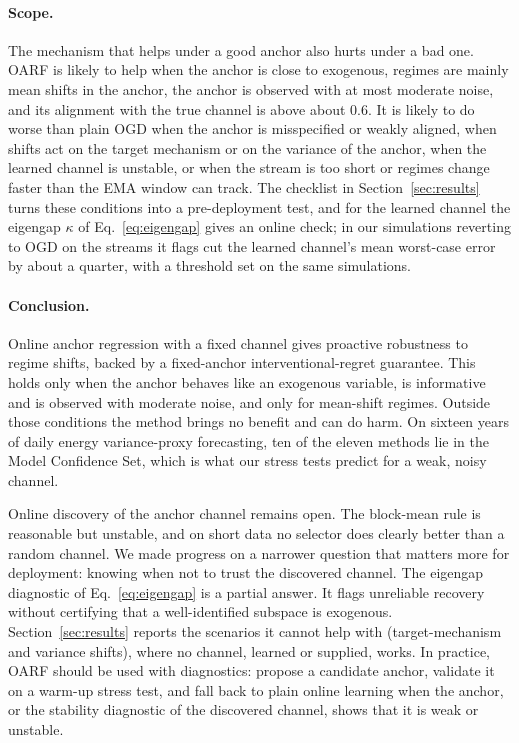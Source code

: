 \documentclass[11pt]{article}
\theoremstyle{plain}
\theoremstyle{remark}
\newcommand{\OARF}{\textsc{OARF}}
\begin{document}
\paragraph{Scope.}
The mechanism that helps under a good anchor also hurts under a bad one. \OARF{} is
likely to help when the anchor is close to exogenous, regimes are mainly mean shifts
in the anchor, the anchor is observed with at most moderate noise, and its alignment
with the true channel is above about $0.6$. It is likely to do worse than plain OGD
when the anchor is misspecified or weakly aligned, when shifts act on the target
mechanism or on the variance of the anchor, when the learned channel is unstable, or
when the stream is too short or regimes change faster than the EMA window can track. The checklist in
Section~\ref{sec:results} turns these conditions into a pre-deployment test, and for
the learned channel the eigengap $\kappa$ of Eq.~\eqref{eq:eigengap} gives an online
check; in our simulations reverting to OGD on the streams it flags cut the learned
channel's mean worst-case error by about a quarter, with a threshold set on the same
simulations.

\paragraph{Conclusion.} Online anchor regression with a fixed channel gives proactive
robustness to regime shifts, backed by a fixed-anchor interventional-regret guarantee.
This holds only when the anchor behaves like an exogenous variable, is informative and
is observed with moderate noise, and only for mean-shift regimes. Outside those
conditions the method brings no benefit and can do harm. On sixteen years of daily energy variance-proxy forecasting, ten of the eleven methods lie in the Model Confidence Set, which is what our stress tests predict for a weak, noisy channel.

Online discovery of the anchor channel remains open. The block-mean rule is
reasonable but unstable, and on short data no selector does clearly better than a random channel. We made progress on a narrower
question that matters more for deployment: knowing when not to trust the discovered
channel. The eigengap diagnostic of Eq.~\eqref{eq:eigengap} is a partial
answer. It flags unreliable recovery without certifying that a well-identified subspace
is exogenous. Section~\ref{sec:results} reports the scenarios it cannot help with
(target-mechanism and variance shifts), where no channel, learned or supplied, works.
In practice, \OARF{} should be used with diagnostics: propose a candidate anchor,
validate it on a warm-up stress test, and fall back to plain online learning when the anchor, or the stability diagnostic of the discovered
channel, shows that it is weak or unstable.
\end{document}
